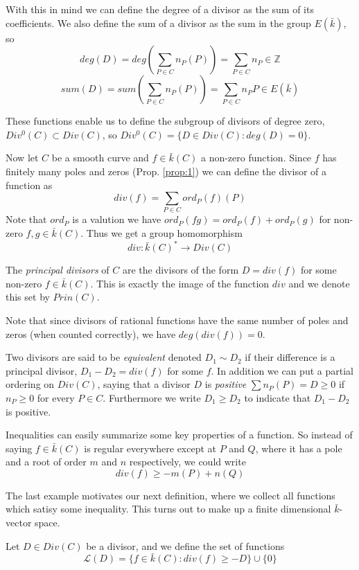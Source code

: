 With this in mind we can define the degree of a divisor as the sum of its 
coefficients. We also define the sum of a divisor as the sum in the group $E(\bar{k})$, so
$$ deg(D) = deg(\sum_{P\in C} n_P(P)) = \sum_{P\in C} n_P \in \mathbb{Z}$$
$$ sum(D) = sum(\sum_{P\in C} n_P(P)) = \sum_{P\in C} n_P P \in E(\bar{k})$$

These functions enable us to define the subgroup of divisors of degree zero,
$Div^0(C) \subset Div(C)$, so $Div^0(C) = \{ D\in Div(C) : deg(D) = 0 \}$.

Now let $C$ be a smooth curve and $f\in \bar{k}(C)$ a non-zero function. Since $f$
has finitely many poles and zeros (Prop. \ref{prop:1}) we can define the divisor of a
function as
$$ div(f) = \sum_{P\in C} ord_P(f)(P) $$
Note that $ord_P$ is a valution we have $ord_P(fg) = ord_P(f)+ord_P(g)$
for non-zero $f,g\in \bar{k}(C)$. Thus we get a group homomorphism
$$ div: \bar{k}(C)^* \rightarrow Div(C)$$

\begin{mydef}
 The \emph{principal divisors} of $C$ are the divisors of the form
$ D = div(f) $ for some non-zero $f\in \bar{k}(C)$. This is exactly
the image of the function $div$ and we denote this set by $Prin(C)$.
\end{mydef}

Note that since divisors of rational functions have the same number of poles
and zeros (when counted correctly), we have $deg(div(f)) = 0$.

Two divisors are said to be \emph{equivalent} denoted $D_1 \sim D_2$ if
their difference is a principal divisor, $D_1 - D_2 = div(f)$ for some $f$. In
addition we can put a partial ordering on $Div(C)$, saying that a divisor $D$ is
\emph{positive} $\sum n_P(P)=D \geq 0$ if $n_P \geq 0$ for every $P\in C$. Furthermore
we write $D_1 \geq D_2$ to indicate that $D_1 - D_2$ is positive.

\begin{ex}
 Inequalities can easily summarize some key properties of a function. So instead of
saying $f \in \bar{k}(C)$ is regular everywhere except at $P$ and $Q$, where it has a
pole and a root of order $m$ and $n$ respectively, we could write
$$ div(f) \geq -m(P)+n(Q) $$
\end{ex}

The last example motivates our next definition, where we collect all functions
which satisy some inequality. This turns out to make up a finite dimensional
$\bar{k}$-vector space.

\begin{mydef}
 Let $D \in Div(C)$ be a divisor, and we define the set of functions
$$ \mathscr{L}(D) = \{ f\in \bar{k}(C) : div(f) \geq -D \} \cup \{ 0\} $$
\end{mydef}

